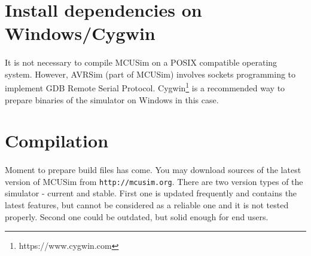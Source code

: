 \section{Install dependencies on Windows/Cygwin}
\paragraph{}
It is not necessary to compile MCUSim on a POSIX compatible operating system.
However, AVRSim (part of MCUSim) involves sockets programming to implement
GDB Remote Serial Protocol. Cygwin\footnote{https://www.cygwin.com} is a
recommended way to prepare binaries of the simulator on Windows in this case.

\section{Compilation}
\paragraph{}
Moment to prepare build files has come. You may download sources of
the latest version of MCUSim from \lstinline|http://mcusim.org|. There are
two version types of the simulator - current and stable. First one is updated
frequently and contains the latest features, but cannot be considered as a
reliable one and it is not tested properly. Second one could be outdated,
but solid enough for end users.
